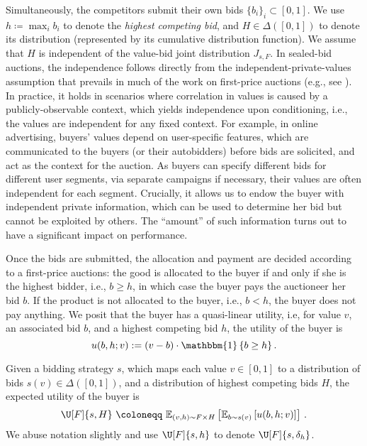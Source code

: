 Simultaneously, the competitors submit their own bids $\{b_i\}_i \subset [0,1]$. We use $h \coloneqq \max_i b_i$ to denote the \emph{highest competing bid}, and $H \in \Delta([0,1])$ to denote its distribution (represented by its cumulative distribution function). We assume that $H$ is independent of the value-bid joint distribution $J_{s,F}$. In sealed-bid auctions, the independence follows directly from the independent-private-values assumption that prevails in much of the work on first-price auctions (e.g., see \citealt{krishna2009auction, milgrom2004putting, balseiro2023contextual, feng2021convergence}). In practice, it holds in scenarios where correlation in values is caused by a publicly-observable context, which yields independence upon conditioning, i.e., the values are independent for any fixed context. For example, in online advertising, buyers' values depend on  user-specific features, which are communicated to the buyers (or their autobidders) before bids are solicited, and act as the context for the auction. As buyers can specify different bids for different user segments, via separate campaigns if necessary, their values are often independent for each segment. Crucially, it allows us to endow the buyer with independent private information, which can be used to determine her bid but cannot be exploited by others. The ``amount'' of such information turns out to have a significant impact on performance.

Once the bids are submitted, the allocation and payment are decided according to a first-price auctions: the good is allocated to the buyer if and only if she is the highest bidder, i.e., $b \geq h$, in which case the buyer pays the auctioneer her bid $b$. If the product is not allocated to the buyer, i.e., $b < h$, the buyer does not pay anything. We posit that the buyer has a quasi-linear utility, i.e, for value $v$, an associated bid $b$, and a highest competing bid $h$, the utility of the buyer is
\begin{equation*}
    u(b,h ; v) := \left( v - b \right) \cdot \mathbbm{1} \left\{ b \geq h \right\}.
\end{equation*}

Given a bidding strategy $s$, which maps each value $v \in [0,1]$ to a distribution of bids $s(v) \in \Delta([0,1])$, and a distribution of highest competing bids $H$, the expected utility of the buyer is
\begin{equation*}
\U[F]{s, H}\ \coloneqq\   \mathbb{E}_{(v, h) \sim F \times H}  \left[ \mathbb{E}_{b \sim s(v)} \left[ u(b,h; v) \right] \right]\,.
\end{equation*}
We abuse notation slightly and use $\U[F]{s, h}$ to denote $\U[F]{s,\delta_h}$.


